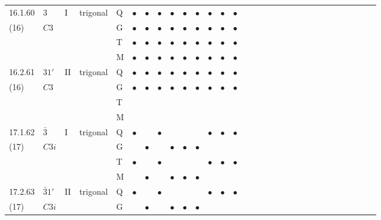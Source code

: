 \documentclass[fleqn,9pt,landscape]{jsarticle}
\begin{document}
\begin{longtable}{lllll|l|l|l|l|l|l|l|l|l|ll|ll|ll|ll|ll|ll|ll|ll}
16.1.60 & \texttt{$3$} & I & trigonal & Q & $\bullet$ & $\bullet$ & $\bullet$ & $\bullet$ & $\bullet$ & $\bullet$ & $\bullet$ & $\bullet$ & $\bullet$ &  &  &  &  &  &  &  &  &  &  &  &  &  &  &  &  \\
(16) & $C3$ &  &  & G & $\bullet$ & $\bullet$ & $\bullet$ & $\bullet$ & $\bullet$ & $\bullet$ & $\bullet$ & $\bullet$ & $\bullet$ &  &  &  &  &  &  &  &  &  &  &  &  &  &  &  &  \\
 &  &  &  & T & $\bullet$ & $\bullet$ & $\bullet$ & $\bullet$ & $\bullet$ & $\bullet$ & $\bullet$ & $\bullet$ & $\bullet$ &  &  &  &  &  &  &  &  &  &  &  &  &  &  &  &  \\
 &  &  &  & M & $\bullet$ & $\bullet$ & $\bullet$ & $\bullet$ & $\bullet$ & $\bullet$ & $\bullet$ & $\bullet$ & $\bullet$ &  &  &  &  &  &  &  &  &  &  &  &  &  &  &  &  \\ \hline
16.2.61 & \texttt{$31'$} & II & trigonal & Q & $\bullet$ & $\bullet$ & $\bullet$ & $\bullet$ & $\bullet$ & $\bullet$ & $\bullet$ & $\bullet$ & $\bullet$ &  &  &  &  &  &  &  &  &  &  &  &  &  &  &  &  \\
(16) & $C3$ &  &  & G & $\bullet$ & $\bullet$ & $\bullet$ & $\bullet$ & $\bullet$ & $\bullet$ & $\bullet$ & $\bullet$ & $\bullet$ &  &  &  &  &  &  &  &  &  &  &  &  &  &  &  &  \\
 &  &  &  & T &  &  &  &  &  &  &  &  &  &  &  &  &  &  &  &  &  &  &  &  &  &  &  &  &  \\
 &  &  &  & M &  &  &  &  &  &  &  &  &  &  &  &  &  &  &  &  &  &  &  &  &  &  &  &  &  \\ \hline
17.1.62 & \texttt{$\bar{3}$} & I & trigonal & Q & $\bullet$ &  & $\bullet$ &  &  &  & $\bullet$ & $\bullet$ & $\bullet$ &  &  &  &  &  &  &  &  &  &  &  &  &  &  &  &  \\
(17) & $C3i$ &  &  & G &  & $\bullet$ &  & $\bullet$ & $\bullet$ & $\bullet$ &  &  &  &  &  &  &  &  &  &  &  &  &  &  &  &  &  &  &  \\
 &  &  &  & T & $\bullet$ &  & $\bullet$ &  &  &  & $\bullet$ & $\bullet$ & $\bullet$ &  &  &  &  &  &  &  &  &  &  &  &  &  &  &  &  \\
 &  &  &  & M &  & $\bullet$ &  & $\bullet$ & $\bullet$ & $\bullet$ &  &  &  &  &  &  &  &  &  &  &  &  &  &  &  &  &  &  &  \\ \hline
17.2.63 & \texttt{$\bar{3}1'$} & II & trigonal & Q & $\bullet$ &  & $\bullet$ &  &  &  & $\bullet$ & $\bullet$ & $\bullet$ &  &  &  &  &  &  &  &  &  &  &  &  &  &  &  &  \\
(17) & $C3i$ &  &  & G &  & $\bullet$ &  & $\bullet$ & $\bullet$ & $\bullet$ &  &  &  &  &  &  &  &  &  &  &  &  &  &  &  &  &  &  &  \\

\end{longtable}
\end{document}
